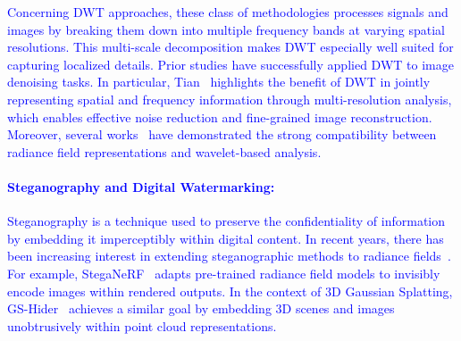 \textcolor{blue}{
Concerning DWT approaches, these class of methodologies processes signals and images by breaking them down into multiple frequency bands at varying spatial resolutions. This multi-scale decomposition makes DWT especially well suited for capturing localized details. Prior studies \cite{mohideen2008image,pimpalkhute2021digital} have successfully applied DWT to image denoising tasks. In particular, Tian~\cite{tian2023multi} highlights the benefit of DWT in jointly representing spatial and frequency information through multi-resolution analysis, which enables effective noise reduction and fine-grained image reconstruction. Moreover, several works~\cite{jang2024waterf, lou2024darenerf, rho2023masked, xu2023wavenerf} have demonstrated the strong compatibility between radiance field representations and wavelet-based analysis.
}

\textcolor{blue}{
\paragraph{Steganography and Digital Watermarking:}
Steganography is a technique used to preserve the confidentiality of information by embedding it imperceptibly within digital content. In recent years, there has been increasing interest in extending steganographic methods to radiance fields~\cite{biswal2024steganerv,dong2024stega4nerf, li2023steganerf}. For example, StegaNeRF~\cite{li2023steganerf} adapts pre-trained radiance field models to invisibly encode images within rendered outputs. In the context of 3D Gaussian Splatting, GS-Hider~\cite{zhang2024gs} achieves a similar goal by embedding 3D scenes and images unobtrusively within point cloud representations.
}

